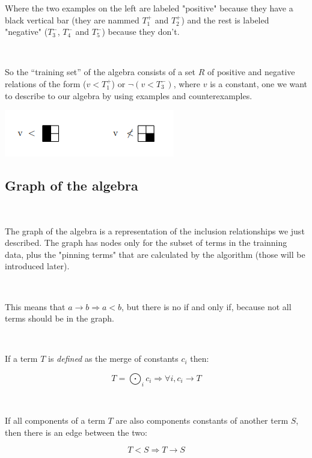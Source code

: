 \documentclass[a4paper, 11pt]{article}
\begin{document}
Where the two examples on the left are labeled "positive" because they have a black vertical bar (they are nammed $T_1^+$ and $T_2^+$) and the rest is labeled "negative" ($T_3^-$, $T_4^-$ and $T_5^-$) because they don't.

\

So the “training set” of the algebra consists of a set $R$ of positive and negative relations of the form
($v < T_1^+$) or $\neg(v < T_3^-)$, where $v$ is a constant, one we want to describe to our algebra
by using examples and counterexamples.

\begin{center}
    \includegraphics{training_data_w_constant.png}
\end{center}

\subsection{Graph of the algebra}

\

The graph of the algebra is a representation of the inclusion relationships we just described. The graph has nodes only for the subset of terms in the trainning data, plus 
the "pinning terms" that are calculated by the algorithm (those will be introduced later). 

\

This means that $a \rightarrow b \Rightarrow a < b$, but there is no if and only if, because not all terms should be in the graph.

\

If a term $T$ is \textit{defined} as the merge of constants $c_i$ then:

\begin{equation*}
    T = \bigodot_i c_i \Rightarrow \forall i, c_i \rightarrow T
\end{equation*}

\

If all components of a term $T$ are also components constants of another term $S$, then there is an edge between the two:

\begin{equation*}
    T < S \Rightarrow T \rightarrow S
\end{equation*}
\end{document}
